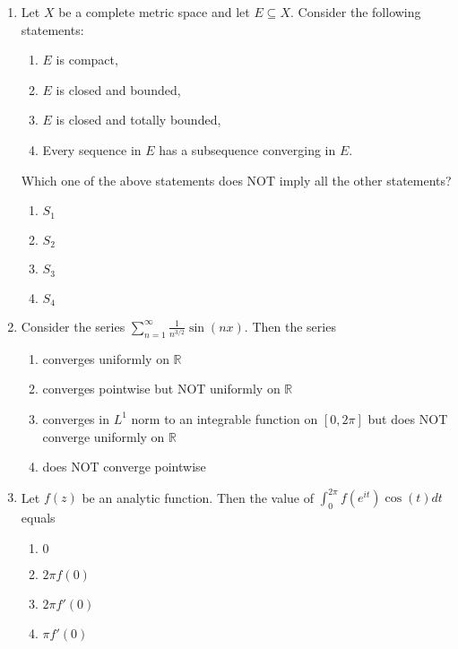 \documentclass[journal]{IEEEtran}
\newcommand{\brak}[1]{\left( #1 \right)}
\newcommand{\sbrak}[1]{\left[ #1 \right]}
\begin{document}
\begin{enumerate}
\item Let $X$ be a complete metric space and let $E \subseteq X$. Consider the following statements:
  \begin{enumerate}
    \item $E$ is compact,
    \item $E$ is closed and bounded,
    \item $E$ is closed and totally bounded,
    \item Every sequence in $E$ has a subsequence converging in $E$.
  \end{enumerate}
  Which one of the above statements does NOT imply all the other statements?

  \begin{multicols}{4}
  \begin{enumerate}
    \item $S_1$
    \item $S_2$
    \item $S_3$
    \item $S_4$
  \end{enumerate}
  \end{multicols}

\item Consider the series
  $\sum_{n=1}^\infty \frac{1}{n^{3/2}}\sin\brak{nx}.$
  Then the series

  \begin{enumerate}
    \item converges uniformly on $\mathbb{R}$
    \item converges pointwise but NOT uniformly on $\mathbb{R}$
    \item converges in $L^1$ norm to an integrable function on $\sbrak{0,2\pi}$ but does NOT
      converge uniformly on $\mathbb{R}$
    \item does NOT converge pointwise
  \end{enumerate}

\item Let $f\brak{z}$ be an analytic function. Then the value of
  $\int_{0}^{2\pi} f\brak{e^{it}} \cos\brak{t} dt$
  equals

  \begin{enumerate}
    \item $0$
    \item $2\pi f\brak{0}$
    \item $2\pi f\prime\brak{0}$
    \item $\pi f\prime\brak{0}$
  \end{enumerate}


\end{enumerate}
\end{document}
